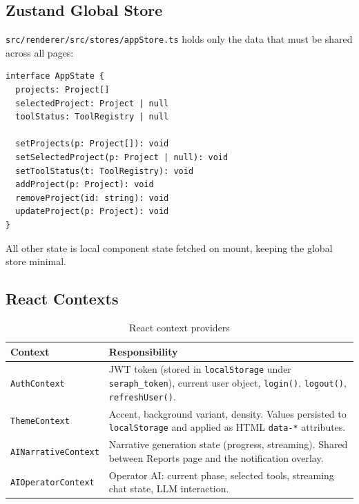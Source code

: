 \documentclass[11pt,a4paper,twoside,openright]{book}
\begin{document}
\subsection{Zustand Global Store}

\texttt{src/renderer/src/stores/appStore.ts} holds only the data that must be shared across all pages:

\begin{codebox}
\begin{lstlisting}[language={[Sharp]C}, numbers=none]
interface AppState {
  projects: Project[]
  selectedProject: Project | null
  toolStatus: ToolRegistry | null

  setProjects(p: Project[]): void
  setSelectedProject(p: Project | null): void
  setToolStatus(t: ToolRegistry): void
  addProject(p: Project): void
  removeProject(id: string): void
  updateProject(p: Project): void
}
\end{lstlisting}
\end{codebox}

All other state is local component state fetched on mount, keeping the global store minimal.

\subsection{React Contexts}

\begin{table}[H]
\centering
\begin{tabularx}{\textwidth}{L{4cm} X}
\toprule
\textbf{Context} & \textbf{Responsibility} \\
\midrule
\texttt{AuthContext}         & JWT token (stored in \texttt{localStorage} under \texttt{seraph\_token}), current user object, \texttt{login()}, \texttt{logout()}, \texttt{refreshUser()}. \\
\texttt{ThemeContext}        & Accent, background variant, density. Values persisted to \texttt{localStorage} and applied as HTML \texttt{data-*} attributes. \\
\texttt{AINarrativeContext}  & Narrative generation state (progress, streaming). Shared between Reports page and the notification overlay. \\
\texttt{AIOperatorContext}   & Operator AI: current phase, selected tools, streaming chat state, LLM interaction. \\
\bottomrule
\end{tabularx}
\caption{React context providers}
\end{table}
\end{document}

